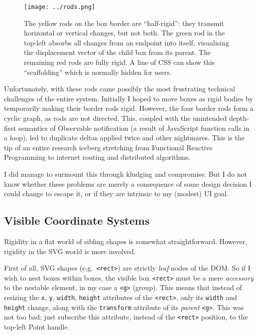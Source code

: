 \begin{figure}[h]
  \centering
  \texttt{[image: ../rods.png]}
  \caption{The yellow rods on the box border are ``half-rigid'': they transmit horizontal or vertical changes, but not both. The green rod in the top-left absorbs all changes from an endpoint into itself, visualising the displacement vector of the child box from its parent. The remaining red rods are fully rigid. A line of CSS can show this ``scaffolding'' which is normally hidden for users. \label{fig:rods}}
\end{figure}

Unfortunately, with these rods came possibly the most frustrating
technical challenges of the entire system. Initially I hoped to move
boxes as rigid bodies by temporarily making their border rods rigid.
However, the four border rods form a cyclic graph, as rods are not
directed. This, coupled with the unintended depth-first semantics of
Observable notification (a result of JavaScript function calls in a
loop), led to duplicate deltas applied twice and other nightmares. This
is the tip of an entire research iceberg stretching from Functional
Reactive Programming to internet routing and distributed algorithms.

I did manage to surmount this through kludging and compromise. But I do
not know whether these problems are merely a consequence of some design
decision I could change to escape it, or if they are intrinsic to my
(modest) UI goal.

\hypertarget{visible-coordinate-systems}{%
\subsection{Visible Coordinate
Systems}\label{visible-coordinate-systems}}

Rigidity in a flat world of sibling shapes is somewhat straightforward.
However, rigidity in the SVG world is more involved.

First of all, SVG shapes (e.g.~\texttt{\textless{}rect\textgreater{}})
are strictly \emph{leaf} nodes of the DOM. So if I wish to nest boxes
within boxes, the visible box \texttt{\textless{}rect\textgreater{}}
must be a mere \emph{accessory} to the nestable element, in my case a
\texttt{\textless{}g\textgreater{}} (group). This means that instead of
resizing the \texttt{x}, \texttt{y}, \texttt{width}, \texttt{height}
attributes of the \texttt{\textless{}rect\textgreater{}}, only its
\texttt{width} and \texttt{height} change, along with the
\texttt{transform} attribute of its \emph{parent}
\texttt{\textless{}g\textgreater{}}. This was not too bad; just
subscribe this attribute, instead of the
\texttt{\textless{}rect\textgreater{}} position, to the top-left Point
handle.


